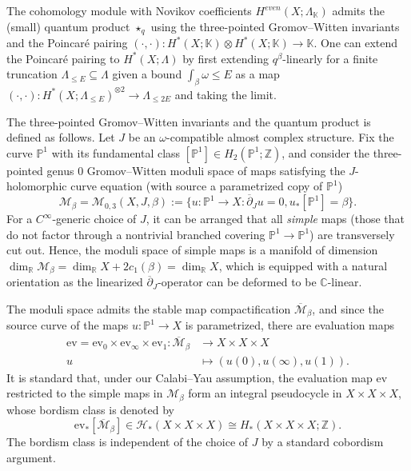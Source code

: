 \documentclass[reqno]{amsart}
\numberwithin{equation}{section}
\numberwithin{equation}{section}
\numberwithin{equation}{section}
\theoremstyle{definition}
\theoremstyle{remark}
\theoremstyle{remark}
\newcommand{\ov}{\overline}
\begin{document}
The cohomology module with Novikov coefficients $H^{even}(X;\Lambda_{\mathbb{K}})$ admits the (small) quantum product $\star_q$ using the three-pointed Gromov--Witten invariants and the Poincar\'e pairing $(\cdot, \cdot) : H^*(X;\mathbb{K}) \otimes H^*(X;\mathbb{K}) \to \mathbb{K}$. One can extend the Poincar\'e pairing to $H^*(X;\Lambda)$ by first extending $q^\beta$-linearly for a finite truncation $\Lambda_{\le E} \subseteq \Lambda$ given a bound $\int_\beta \omega \le E$ as a map $(\cdot, \cdot) : H^*(X;\Lambda_{\le E})^{\otimes 2} \to \Lambda_{\le 2E}$ and taking the limit.

The three-pointed Gromov--Witten invariants and the quantum product is defined as follows. Let $J$ be an $\omega$-compatible almost complex structure. Fix the curve $ \mathbb{P}^1$ with its fundamental class $[\mathbb{P}^1] \in H_2(\mathbb{P}^1;\mathbb{Z})$, and consider the three-pointed genus $0$ Gromov--Witten moduli space of maps satisfying the $J$-holomorphic curve equation (with source a parametrized copy of $\mathbb{P}^1$)
\begin{equation}
    \mathcal{M}_\beta = \mathcal{M}_{0,3}(X, J,  \beta)  := \{ u : \mathbb{P}^1 \to X: \overline{\partial}_J u = 0,  u_*[\mathbb{P}^1] = \beta \}.
\end{equation}
For a $C^\infty$-generic choice of $J$, it can be arranged that all \emph{simple} maps (those that do not factor through a nontrivial branched covering $\mathbb{P}^1 \to \mathbb{P}^1$) are transversely cut out. Hence, the moduli space of simple maps is a manifold of dimension $\dim_{\mathbb{R}} \mathcal{M}_\beta = \dim_{\mathbb{R}} X + 2c_1(\beta) = \dim_{\mathbb{R}} X$, which is equipped with a natural orientation as the linearized $\ov{\partial}_J$-operator can be deformed to be $\mathbb{C}$-linear.


The moduli space admits the stable map compactification $\ov{\mathcal{M}}_\beta$, and since the source curve of the maps $u : \mathbb{P}^1 \to X$ is parametrized, there are evaluation maps
\begin{align}
    \mathrm{ev} = \mathrm{ev}_0 \times \mathrm{ev}_\infty \times \mathrm{ev}_1 : \ov{\mathcal{M}}_\beta &\to X \times X \times X \\
    u &\mapsto (u(0), u(\infty), u(1)).
\end{align}
It is standard that, under our Calabi--Yau assumption, the evaluation map $\mathrm{ev}$ restricted to the simple maps in $\mathcal{M}_\beta$ form an integral pseudocycle in $X \times X \times X$, whose bordism class is denoted by
\begin{equation}
    \mathrm{ev}_* [\ov{\mathcal{M}}_\beta] \in \mathcal{H}_*(X \times X \times X) \cong H_*(X \times X \times X ; \mathbb{Z}).
\end{equation}
The bordism class is independent of the choice of $J$ by a standard cobordism argument.
\end{document}
